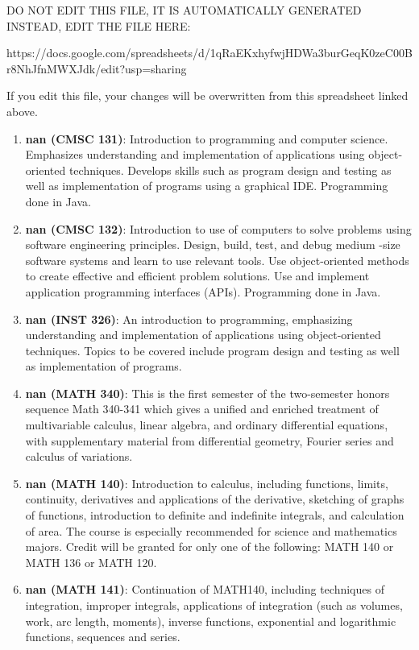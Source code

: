 
DO NOT EDIT THIS FILE, IT IS AUTOMATICALLY GENERATED
INSTEAD, EDIT THE FILE HERE:

https://docs.google.com/spreadsheets/d/1qRaEKxhyfwjHDWa3burGeqK0zeC00Br8NhJfnMWXJdk/edit?usp=sharing

If you edit this file, your changes will be overwritten from this spreadsheet
linked above.

\begin{enumerate}
\item \textbf{nan (CMSC 131)}: Introduction to programming and computer science. Emphasizes understanding and implementation of applications using object-oriented techniques. Develops skills such as program design and testing as well as implementation of programs using a graphical IDE. Programming done in Java.
\item \textbf{nan (CMSC 132)}: Introduction to use of computers to solve problems using software engineering principles. Design, build, test, and debug medium -size software systems and learn to use relevant tools. Use object-oriented methods to create effective and efficient problem solutions. Use and implement application programming interfaces (APIs). Programming done in Java.
\item \textbf{nan (INST 326)}: An introduction to programming, emphasizing understanding and
implementation of applications using object-oriented techniques. Topics to
be covered include program design and testing as well as implementation of
programs.
\item \textbf{nan (MATH 340)}: This is the first semester of the two-semester honors sequence Math 340-341 which gives a unified and enriched treatment of multivariable calculus, linear algebra, and ordinary differential equations, with supplementary material from differential geometry, Fourier series and calculus of variations.
\item \textbf{nan (MATH 140)}: Introduction to calculus, including functions, limits, continuity, derivatives and applications of the derivative, sketching of graphs of functions, introduction to definite and indefinite integrals, and calculation of area. The course is especially recommended for science and mathematics majors. Credit will be granted for only one of the following: MATH 140 or MATH 136 or MATH 120.
\item \textbf{nan (MATH 141)}: Continuation of MATH140, including techniques of integration, improper integrals, applications of integration (such as volumes, work, arc length, moments), inverse functions, exponential and logarithmic functions, sequences and series.

\end{enumerate}
